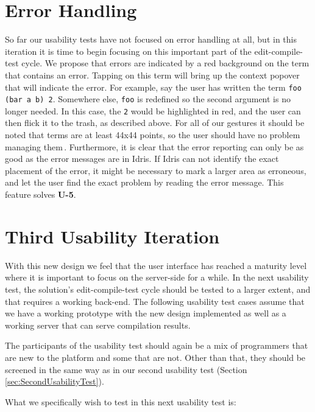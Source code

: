 \section{Error Handling}
\label{subsec:error_handling}
So far our usability tests have not focused on error handling at all, but in this iteration it is time to begin focusing on this important part of the edit-compile-test cycle.
We propose that errors are indicated by a red background on the term that contains an error. 
Tapping on this term will bring up the context popover that will indicate the error.
For example, say the user has written the term \texttt{foo (bar a b) 2}.
Somewhere else, \texttt{foo} is redefined so the second argument is no longer needed.
In this case, the \texttt{2} would be highlighted in red, and the user can then flick it to the trash, as described above.
For all of our gestures it should be noted that terms are at least 44x44
points, so the user should have no problem managing them\,\cite[p. 30]{mobileHIG}.
Furthermore, it is clear that the error reporting can only be as good as the error messages are in Idris.
If Idris can not identify the exact placement of the error, it might be necessary to mark a larger area as erroneous, and let the user find the exact problem by reading the error message.
This feature solves \textbf{U-5}.

\section{Third Usability Iteration}
\label{subsec:third_usability_test}
With this new design we feel that the user interface has reached a maturity
level where it is important to focus on the server-side for a while. In the
next usability test, the solution's edit-compile-test cycle should be tested to
a larger extent, and that requires a working back-end. The following usability
test cases assume that we have a working prototype with the new design
implemented as well as a working server that can serve compilation results.

The participants of the usability test should again be a mix of programmers
that are new to the platform and some that are not. Other than that, they
should be screened in the same way as in our second usability test (Section
\ref{sec:SecondUsabilityTest}).

What we specifically wish to test in this next usability test is:

